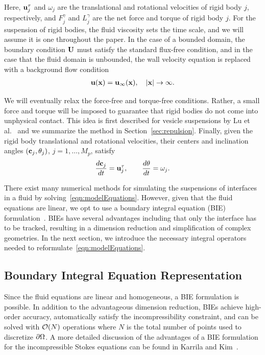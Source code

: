 \documentclass[preprint, 10pt]{elsarticle}
\begin{document}
Here, ${\mathbf{u}}^\tau_j$ and $\omega_j$ are the translational and rotational
velocities of rigid body $j$, respectively, and $F_j^\gamma$ and
$L_j^\gamma$ are the net force and torque of rigid body $j$.  For the
suspension of rigid bodies, the fluid viscosity sets the time scale, and
we will assume it is one throughout the paper.  In the case of a bounded
domain, the boundary condition ${\mathbf{U}}$ must satisfy the standard flux-free
condition, and in the case that the fluid domain is unbounded, the wall
velocity equation is replaced with a background flow condition
\begin{align*}
  {\mathbf{u}}({\mathbf{x}}) = {\mathbf{u}}_\infty({\mathbf{x}}), \quad |{\mathbf{x}}| \rightarrow \infty.
\end{align*}

We will eventually relax the force-free and torque-free conditions.
Rather, a small force and torque will be imposed to guarantee that rigid
bodies do not come into unphysical contact.  This idea is first
described for vesicle suspensions by Lu et al.~\cite{Lu2017} and we
summarize the method in Section~\ref{sec:repulsion}.  Finally, given the
rigid body translational and rotational velocities, their centers and
inclination angles $({\mathbf{c}}_j,\theta_j)$, $j=1,\ldots,M_p$, satisfy
\begin{align*}
  \frac{d{\mathbf{c}}_j}{dt} = {\mathbf{u}}^\tau_j, \qquad 
  \frac{d\theta}{dt} = \omega_j.
\end{align*}

There exist many numerical methods for simulating the suspensions of
interfaces in a fluid by solving~\eqref{eqn:modelEquations}.  However,
given that the fluid equations are linear, we opt to use a boundary
integral equation (BIE) formulation~\cite{Pozrikidis1992}.  BIEs have
several advantages including that only the interface has to be tracked,
resulting in a dimension reduction and simplification of complex
geometries.  In the next section, we introduce the necessary integral
operators needed to reformulate~\eqref{eqn:modelEquations}.

\subsection{Boundary Integral Equation Representation}
Since the fluid equations are linear and homogeneous, a BIE formulation
is possible.  In addition to the advantageous dimension reduction, BIEs
achieve high-order accuracy, automatically satisfy the incompressibility
constraint, and can be solved with ${\mathcal{O}}(N)$ operations where $N$ is
the total number of points used to discretize ${\partial}\Omega$.  A more
detailed discussion of the advantages of a BIE formulation for the
incompressible Stokes equations can be found in Karrila and
Kim~\cite{Karrila1989}.
\end{document}
